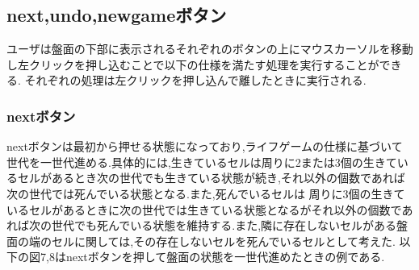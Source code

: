 \documentclass[dvipdfmx]{jarticle}
\begin{document}
\subsection{next,undo,newgameボタン}
ユーザは盤面の下部に表示されるそれぞれのボタンの上にマウスカーソルを移動し左クリックを押し込むことで以下の仕様を満たす処理を実行することができる.
それぞれの処理は左クリックを押し込んで離したときに実行される.
\subsubsection{nextボタン}
nextボタンは最初から押せる状態になっており,ライフゲームの仕様に基づいて世代を一世代進める.具体的には,生きているセルは周りに2または3個の生きているセルがあるとき次の世代でも生きている状態が続き,それ以外の個数であれば次の世代では死んでいる状態となる.また,死んでいるセルは
周りに3個の生きているセルがあるときに次の世代では生きている状態となるがそれ以外の個数であれば次の世代でも死んでいる状態を維持する.また,隣に存在しないセルがある盤面の端のセルに関しては,その存在しないセルを死んでいるセルとして考えた.
以下の図7,8はnextボタンを押して盤面の状態を一世代進めたときの例である.
\end{document}

